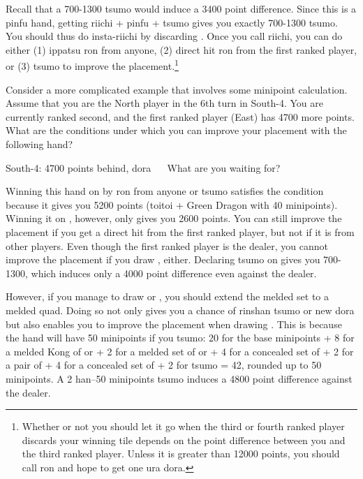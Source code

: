 \bigskip
Recall that a 700-1300 {\jap tsumo} would induce a 3400 point difference. Since this is a {\jap pinfu} hand, getting {\jap riichi + pinfu + tsumo} gives you exactly 700-1300 {\jap tsumo}. You should thus do insta-riichi by discarding {\LARGE{}}. Once you call riichi, you can do either (1) {\jap ippatsu ron} from anyone, (2) direct hit {\jap ron} from the first ranked player, or (3) {\jap tsumo} to improve the placement.\footnote{Whether or not you should let it go when the third or fourth ranked player discards your winning tile depends on the point difference between you and the third ranked player. Unless it is greater than 12000 points, you should call {\jap ron} and hope to get one {\jap ura dora}.}

\bigskip
Consider a more complicated example that involves some minipoint calculation. Assume that you are the North player in the 6th turn in South-4. You are currently ranked second, and the first ranked player (East) has 4700 more points.
What are the conditions under which you can improve your placement with the following hand?

\bigskip
\begin{itembox}[r]{South-4: 4700 points behind, {\jap dora} {\LARGE{}}}
\bp
{}\fa\fa~~
\ep
\vspace{-10pt}
What are you waiting for?
\end{itembox}
\noindent Winning this hand on {\LARGE\fa} by {\jap ron} from anyone or {\jap tsumo} satisfies the condition because it gives you 5200 points ({\jap toitoi} + Green Dragon with 40 minipoints). Winning it on {\LARGE{}}, however, only gives you 2600 points. You can still improve the placement if you get a direct hit from the first ranked player, but not if it is from other players. Even though the first ranked player is the dealer, you cannot improve the placement if you draw {\LARGE{}}, either. Declaring {\jap tsumo} on {\LARGE{}} gives you 700-1300, which induces only a 4000 point difference even against the dealer.

\bigskip
However, if you manage to draw {\LARGE{}} or {\LARGE{}}, you should extend the melded set to a melded quad. Doing so not only gives you a chance of {\jap rinshan tsumo} or new {\jap dora} but also enables you to improve the placement when drawing {\LARGE{}}. This is because the hand will have 50 minipoints if you {\jap tsumo}: 20 for the base minipoints + 8 for a melded Kong of {\LARGE{}} or {\LARGE{}} + 2 for a melded set of {\LARGE{}} or {\LARGE{}} + 4 for a concealed set of {\LARGE{}} + 2 for a pair of {\LARGE\fa} + 4 for a concealed set of {\LARGE{}} + 2 for {\jap tsumo} = 42, rounded up to 50 minipoints. A 2 {\jap han}--50 minipoints {\jap tsumo} induces a 4800 point difference against the dealer.

